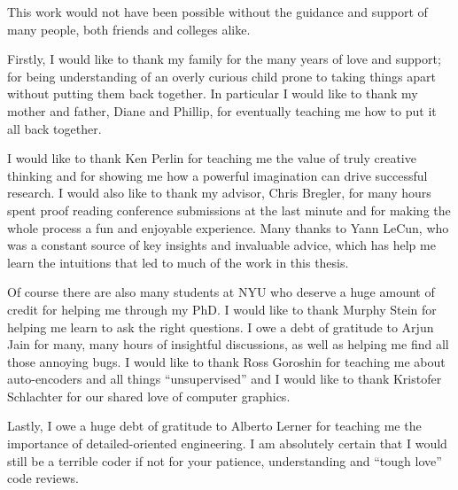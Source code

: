 This work would not have been possible without the guidance and support of many people, both friends and colleges alike.

Firstly, I would like to thank my family for the many years of love and support; for being understanding of an overly curious child prone to taking things apart without putting them back together. In particular I would like to thank my mother and father, Diane and Phillip, for eventually teaching me how to put it all back together.

I would like to thank Ken Perlin for teaching me the value of truly creative thinking and for showing me how a powerful imagination can drive successful research. I would also like to thank my advisor, Chris Bregler, for many hours spent proof reading conference submissions at the last minute and for making the whole process a fun and enjoyable experience. Many thanks to Yann LeCun, who was a constant source of key insights and invaluable advice, which has help me learn the intuitions that led to much of the work in this thesis.

Of course there are also many students at NYU who deserve a huge amount of credit for helping me through my PhD. I would like to thank Murphy Stein for helping me learn to ask the right questions. I owe a debt of gratitude to Arjun Jain for many, many hours of insightful discussions, as well as helping me find all those annoying bugs. I would like to thank Ross Goroshin for teaching me about auto-encoders and all things ``unsupervised'' and I would like to thank Kristofer Schlachter for our shared love of computer graphics.

Lastly, I owe a huge debt of gratitude to Alberto Lerner for teaching me the importance of detailed-oriented engineering. I am absolutely certain that I would still be a terrible coder if not for your patience, understanding and ``tough love'' code reviews.
